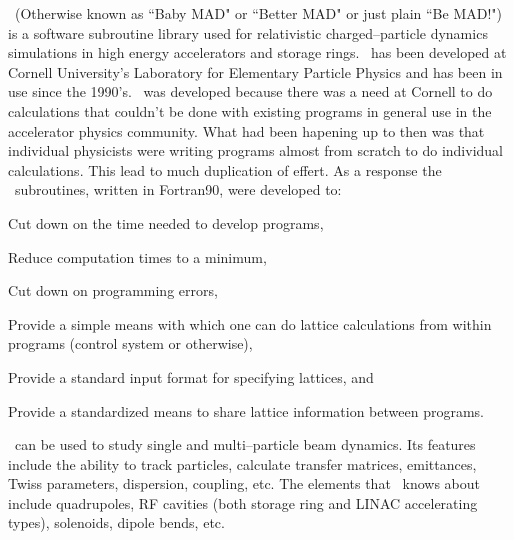 
\bmad\ (Otherwise known as ``Baby MAD" or ``Better MAD" or just plain
``Be MAD!")  is a software subroutine library used for relativistic
charged--particle dynamics simulations in high energy accelerators and
storage rings. \bmad\ has been developed at Cornell University's
Laboratory for Elementary Particle Physics and has been in use since the
1990's. \bmad\ was developed because there was a need at Cornell to do
calculations that couldn't be done with existing programs in general use
in the accelerator physics community. What had been hapening up to then
was that individual physicists were writing programs almost from scratch 
to do individual calculations. This lead to much duplication of effert.
As a response the \bmad\ subroutines, written in
Fortran90, were developed to:
\begin{Itemize}
\item Cut down on the time needed to develop programs,
\item Reduce computation times to a minimum,
\item Cut down on programming errors, 
\item Provide a simple means with which one can do lattice calculations 
from within programs (control system or otherwise),
\item Provide a standard input format for specifying lattices, and
\item Provide a standardized means to share lattice information between 
programs.
\end{Itemize}

\bmad\ can be used to study single and multi--particle beam dynamics. Its 
features include the ability to track particles, calculate transfer matrices,
emittances, Twiss parameters, 
dispersion, coupling, etc. The elements that \bmad\ knows about include
quadrupoles, RF cavities (both storage ring and LINAC accelerating types),
solenoids, dipole bends, etc. 

\vfill
\break
